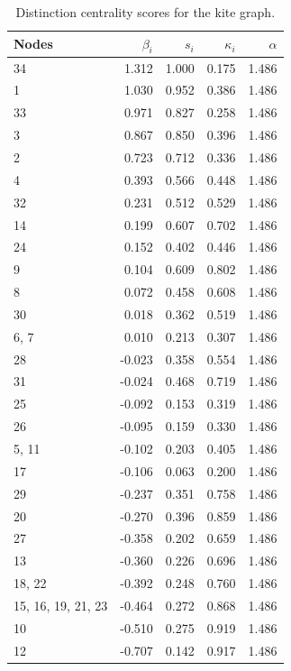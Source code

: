 \begin{table}
\centering
\caption{\label{tab:kite}Distinction centrality scores for the kite graph.}
\centering
\begin{tabular}[t]{lrrrr}
\toprule
Nodes & $\beta_i$ & $s_i$ & $\kappa_i$ & $\alpha$\\
\midrule
34 & 1.312 & 1.000 & 0.175 & 1.486\\
1 & 1.030 & 0.952 & 0.386 & 1.486\\
33 & 0.971 & 0.827 & 0.258 & 1.486\\
3 & 0.867 & 0.850 & 0.396 & 1.486\\
2 & 0.723 & 0.712 & 0.336 & 1.486\\
4 & 0.393 & 0.566 & 0.448 & 1.486\\
32 & 0.231 & 0.512 & 0.529 & 1.486\\
14 & 0.199 & 0.607 & 0.702 & 1.486\\
24 & 0.152 & 0.402 & 0.446 & 1.486\\
9 & 0.104 & 0.609 & 0.802 & 1.486\\
8 & 0.072 & 0.458 & 0.608 & 1.486\\
30 & 0.018 & 0.362 & 0.519 & 1.486\\
6, 7 & 0.010 & 0.213 & 0.307 & 1.486\\
28 & -0.023 & 0.358 & 0.554 & 1.486\\
31 & -0.024 & 0.468 & 0.719 & 1.486\\
25 & -0.092 & 0.153 & 0.319 & 1.486\\
26 & -0.095 & 0.159 & 0.330 & 1.486\\
5, 11 & -0.102 & 0.203 & 0.405 & 1.486\\
17 & -0.106 & 0.063 & 0.200 & 1.486\\
29 & -0.237 & 0.351 & 0.758 & 1.486\\
20 & -0.270 & 0.396 & 0.859 & 1.486\\
27 & -0.358 & 0.202 & 0.659 & 1.486\\
13 & -0.360 & 0.226 & 0.696 & 1.486\\
18, 22 & -0.392 & 0.248 & 0.760 & 1.486\\
15, 16, 19, 21, 23 & -0.464 & 0.272 & 0.868 & 1.486\\
10 & -0.510 & 0.275 & 0.919 & 1.486\\
12 & -0.707 & 0.142 & 0.917 & 1.486\\
\bottomrule
\end{tabular}
\end{table}
